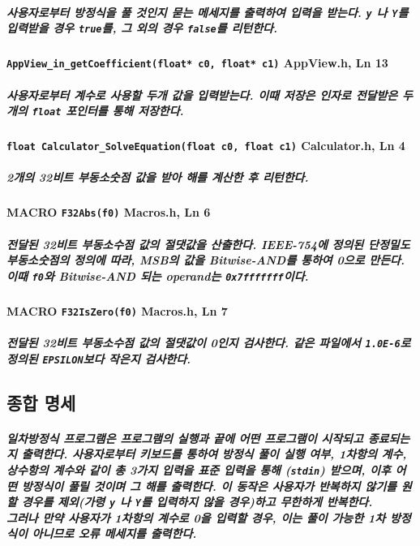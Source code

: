 \documentclass{article}
\begin{document}
    \subparagraph{\normalfont 사용자로부터 방정식을 풀 것인지 묻는 메세지를 출력하여 입력을 받는다. \texttt{y} 나 \texttt{Y}를 입력받을 경우 \texttt{true}를, 그 외의 경우 \texttt{false}를 리턴한다.}

    \paragraph{\large\texttt{AppView\_in\_getCoefficient(float* c0, float* c1)} \tiny AppView.h, Ln 13}

    \subparagraph{\normalfont 사용자로부터 계수로 사용할 두개 값을 입력받는다. 이때 저장은 인자로 전달받은 두개의 \texttt{float} 포인터를 통해 저장한다.}

    \paragraph{\large\texttt{float Calculator\_SolveEquation(float c0, float c1)} \tiny Calculator.h, Ln 4}

    \subparagraph{\normalfont 2개의 32비트 부동소숫점 값을 받아 해를 계산한 후 리턴한다.}

    \paragraph{MACRO \large\texttt{F32Abs(f0)} \tiny Macros.h, Ln 6}

    \subparagraph{ 전달된 32비트 부동소수점 값의 절댓값을 산출한다. IEEE-754에 정의된 단정밀도 부동소숫점의 정의에 따라, MSB의 값을 Bitwise-AND를 통하여 0으로 만든다. 이때 \texttt{f0}와 Bitwise-AND 되는 operand는 \texttt{0x7fffffff}이다.}

    \paragraph{MACRO \large\texttt{F32IsZero(f0)} \tiny Macros.h, Ln 7}

    \subparagraph{ 전달된 32비트 부동소수점 값의 절댓값이 0인지 검사한다. 같은 파일에서 \texttt{1.0E-6}로 정의된 \texttt{EPSILON}보다 작은지 검사한다.}

    \subsection{종합 명세}

    \subparagraph{ 일차방정식 프로그램은 프로그램의 실행과 끝에 어떤 프로그램이 시작되고 종료되는지 출력한다. 
    사용자로부터 키보드를 통하여 방정식 풀이 실행 여부, 1차항의 계수, 상수항의 계수와 같이 총 3가지 입력을 표준 입력을 통해 (\texttt{stdin}) 받으며, 이후 어떤 방정식이 풀릴 것이며 그 해를 출력한다. 이 동작은 사용자가 반복하지 않기를 원할 경우를 제외(가령 \texttt{y} 나 \texttt{Y}를 입력하지 않을 경우)하고 무한하게 반복한다.\\
    그러나 만약 사용자가 1차항의 계수로 0을 입력할 경우, 이는 풀이 가능한 1차 방정식이 아니므로 오류 메세지를 출력한다.}
\end{document}
